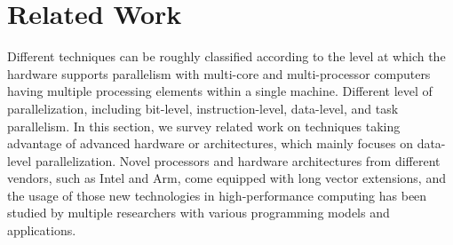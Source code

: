 \documentclass[sigconf]{acmart}
\begin{document}
\section{Related Work}\label{sec:related}
Different techniques can be roughly classified according to the level at which
the hardware supports parallelism with multi-core and multi-processor computers having
multiple processing elements within a single machine. Different level of parallelization,
including bit-level, instruction-level, data-level, and task parallelism.
%
In this section, we survey related work on techniques taking advantage of
advanced hardware or architectures, which mainly focuses on data-level parallelization.
Novel processors and hardware architectures from different vendors, such as Intel and Arm,
come equipped with long vector extensions, and the usage of those new technologies in high-performance computing has been
studied by multiple researchers with various programming models and applications.
%
\end{document}
